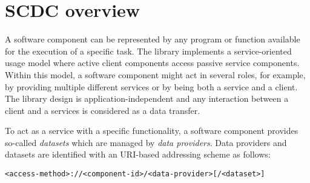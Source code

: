\section{SCDC overview}
\label{sect:intro_overview}

A software component can be represented by any program or function available for the execution of a specific task.
The library implements a service-oriented usage model where active client components access passive service components.
Within this model, a software component might act in several roles, for example, by providing multiple different services or by being both a service and a client.
The library design is application-independent and any interaction between a client and a services is considered as a data transfer.

To act as a service with a specific functionality, a software component provides so-called \textit{datasets} which are managed by \textit{data providers}.
Data providers and datasets are identified with an URI-based addressing scheme as follows:
\begin{alltt}
  <access-method>://<component-id>/<data-provider>[/<dataset>]
\end{alltt}
